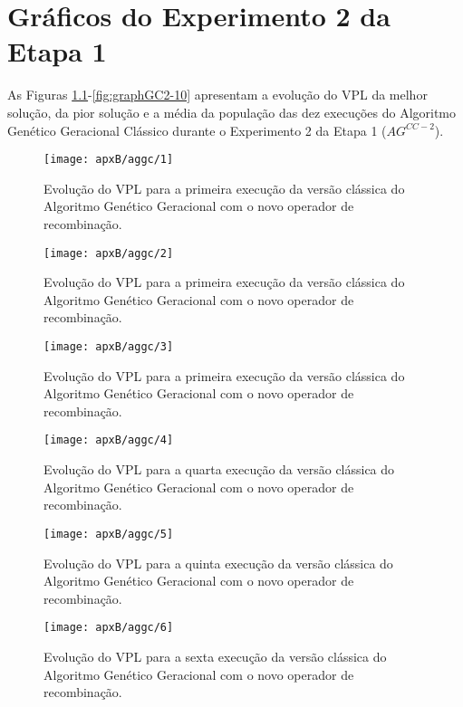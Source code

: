 \chapter{Gráficos do Experimento 2 da Etapa 1}
As Figuras \ref{fig:graphGC2-01}-\ref{fig:graphGC2-10} apresentam a evolução do VPL da melhor solução, da pior solução e a média da população das dez execuções do Algoritmo Genético Geracional Clássico durante o Experimento 2 da Etapa 1 ($AG^{CC-2}$).

\begin{figure}[H]
\centering
\texttt{[image: apxB/aggc/1]}
\caption{Evolução do VPL para a primeira execução da versão clássica do Algoritmo Genético Geracional com o novo operador de recombinação.}
\label{fig:graphGC2-01}
\end{figure}

\begin{figure}[H]
\centering
\texttt{[image: apxB/aggc/2]}
\caption{Evolução do VPL para a primeira execução da versão clássica do Algoritmo Genético Geracional com o novo operador de recombinação.}
\label{fig:graphGC2-02}
\end{figure}

\begin{figure}[H]
\centering
\texttt{[image: apxB/aggc/3]}
\caption{Evolução do VPL para a primeira execução da versão clássica do Algoritmo Genético Geracional com o novo operador de recombinação.}
\label{fig:graphGC2-03}
\end{figure}

\begin{figure}[H]
\centering
\texttt{[image: apxB/aggc/4]}
\caption{Evolução do VPL para a quarta execução da versão clássica do Algoritmo Genético Geracional com o novo operador de recombinação.}
\label{fig:graphGC2-04}
\end{figure}

\begin{figure}[H]
\centering
\texttt{[image: apxB/aggc/5]}
\caption{Evolução do VPL para a quinta execução da versão clássica do Algoritmo Genético Geracional com o novo operador de recombinação.}
\label{fig:graphGC2-05}
\end{figure}

\begin{figure}[H]
\centering
\texttt{[image: apxB/aggc/6]}
\caption{Evolução do VPL para a sexta execução da versão clássica do Algoritmo Genético Geracional com o novo operador de recombinação.}
\label{fig:graphGC2-06}
\end{figure}

